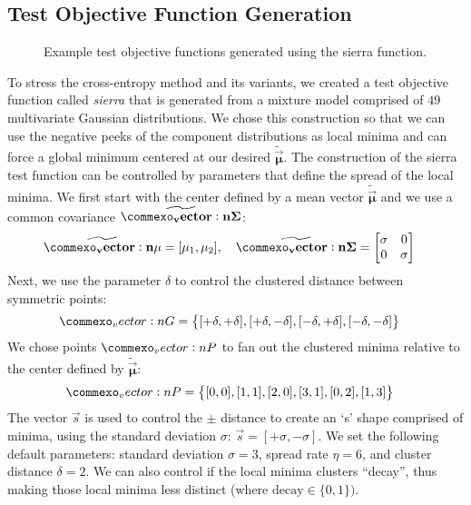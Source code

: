 \subsection{Test Objective Function Generation}\label{sec:sierra}
\begin{figure*}[!t]
  \centering
  \resizebox{0.8\textwidth}{!}{}
  \caption{
    \label{fig:sierra}
    Example test objective functions generated using the sierra function.  
  }
\end{figure*}
To stress the cross-entropy method and its variants, we created a test objective function called \textit{sierra} that is generated from a mixture model comprised of $49$ multivariate Gaussian distributions.
We chose this construction so that we can use the negative peeks of the component distributions as local minima and can force a global minimum centered at our desired $\mathbf{\widetilde{\vec{\mu}}}$.
The construction of the sierra test function can be controlled by parameters that define the spread of the local minima.
We first start with the center defined by a mean vector $\mathbf{\widetilde{\vec{\mu}}}$ and we use a common covariance $\mathbf{\widetilde{\mat{\Sigma}}}$:
\begin{align*}
    \mathbf{\widetilde{\vec{\mu}}} &= [\mu_1, \mu_2], \quad \mathbf{\widetilde{\mat{\Sigma}}} = \begin{bmatrix}\sigma & 0\\ 0 & \sigma \end{bmatrix}
\end{align*}
Next, we use the parameter $\delta$ to control the clustered distance between symmetric points:
\begin{align*}
    \mat{G} &= \left\{[+\delta, +\delta], [+\delta, -\delta], [-\delta, +\delta], [-\delta, -\delta]\right\}
\end{align*}
We chose points $\mat{P}$ to fan out the clustered minima relative to the center defined by $\mathbf{\widetilde{\vec{\mu}}}$:
\begin{align*}
    \mat{P} &= \left\{[0, 0], [1, 1], [2, 0], [3, 1], [0, 2], [1, 3]\right\}
\end{align*}
The vector $\vec{s}$ is used to control the $\pm$ distance to create an `s' shape comprised of minima, using the standard deviation $\sigma$:
$\vec{s} = [+\sigma, -\sigma]$.
We set the following default parameters: standard deviation $\sigma=3$, spread rate $\eta=6$, and cluster distance $\delta=2$.
We can also control if the local minima clusters ``decay'', thus making those local minima less distinct (where $\text{decay} \in \{0, 1\})$.
